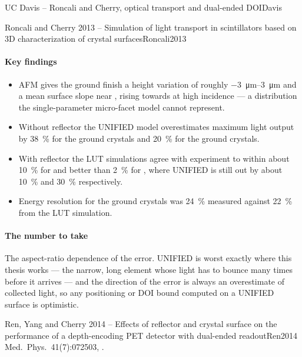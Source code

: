 \begin{programnote}{UC Davis -- Roncali and Cherry, optical transport and dual-ended DOI}{Davis}
\begin{papernote}{Roncali and Cherry 2013 -- Simulation of light transport in scintillators based on 3D characterization of crystal surfaces}{Roncali2013}
\paragraph{Key findings}
\begin{itemize}
	\item AFM gives the ground finish a height variation of roughly
		\qtyrange{-3}{3}{\micro\metre} and a mean surface slope near ,
		rising towards  at high incidence --- a distribution the
		single-parameter micro-facet model cannot represent.
	\item Without reflector the UNIFIED model overestimates maximum light
		output by \qty{38}{\percent} for the ground
		 crystals and \qty{20}{\percent}
		for the ground  crystals.
	\item With reflector the LUT simulations agree with experiment to within
		about \qty{10}{\percent} for  and
		better than \qty{2}{\percent} for
		, where UNIFIED is still out by
		about \qty{10}{\percent} and \qty{30}{\percent} respectively.
	\item Energy resolution for the ground
		 crystals was \qty{24}{\percent}
		measured against \qty{22}{\percent} from the LUT simulation.
\end{itemize}

\paragraph{The number to take}
The aspect-ratio dependence of the error. UNIFIED is worst exactly where this
thesis works --- the narrow, long element whose light has to bounce many times
before it arrives --- and the direction of the error is always an overestimate of
collected light, so any positioning or DOI bound computed on a UNIFIED surface
is optimistic.

\end{papernote}

\begin{papernote}{Ren, Yang and Cherry 2014 -- Effects of reflector and crystal surface on the performance of a depth-encoding PET detector with dual-ended readout}{Ren2014}
Med.\ Phys.\ 41(7):072503, .


\end{papernote}
\end{programnote}
